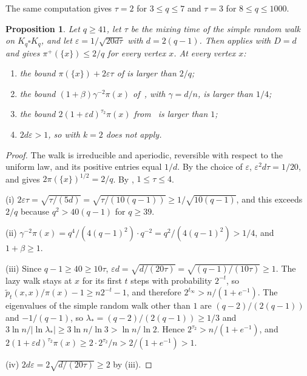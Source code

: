 \documentclass[11pt]{article}
\newtheorem{proposition}[theorem]{Proposition}
\theoremstyle{remark}
\theoremstyle{plain}
\begin{document}
The same computation gives $\tau=2$ for $3\le q\le7$ and $\tau=3$ for $8\le q\le1000$.

\begin{proposition}\label{prop:rook}
Let $q\ge41$, let $\tau$ be the mixing time of the simple random walk on $K_q\square K_q$, and let
$\varepsilon=1/\sqrt{20d\tau}$ with $d=2(q-1)$. Then  applies with $D=d$ and gives
$\pi^+(\{x\})\le2/q$ for every vertex $x$. At every vertex $x$:
\begin{enumerate}[label=(\roman*)]
\item the bound $\pi(\{x\})+2\varepsilon\tau$ of  is larger than $2/q$;
\item the bound $(1+\beta)\gamma^{-2}\pi(x)$ of~\cite[Proposition~4.7]{HSS}, with $\gamma=d/n$, is larger than $1/4$;
\item the bound $2(1+\varepsilon d)^{\tau_2}\pi(x)$ from~\cite[Proposition~4.8]{HSS} is larger than $1$;
\item $2d\varepsilon>1$, so \cite[Theorem~3.3]{Zu} with $k=2$ does not apply.
\end{enumerate}
\end{proposition}

\begin{proof}
The walk is irreducible and aperiodic, reversible with respect to the uniform law, and its positive entries equal
$1/d$. By the choice of $\varepsilon$, $\varepsilon^2d\tau=1/20$, and  gives $2\pi(\{x\})^{1/2}=2/q$.
By , $1\le\tau\le4$.

(i) $2\varepsilon\tau=\sqrt{\tau/(5d)}=\sqrt{\tau/(10(q-1))}\ge1/\sqrt{10(q-1)}$, and this exceeds $2/q$ because
$q^2>40(q-1)$ for $q\ge39$.

(ii) $\gamma^{-2}\pi(x)=q^4/(4(q-1)^2)\cdot q^{-2}=q^2/(4(q-1)^2)>1/4$, and $1+\beta\ge1$.

(iii) Since $q-1\ge40\ge10\tau$, $\varepsilon d=\sqrt{d/(20\tau)}=\sqrt{(q-1)/(10\tau)}\ge1$. The lazy walk stays at $x$
for its first $t$ steps with probability $2^{-t}$, so $\tilde p_t(x,x)/\pi(x)-1\ge n2^{-t}-1$, and therefore
$2^{t_\infty}>n/(1+e^{-1})$. The eigenvalues of the simple random walk other than $1$ are
$(q-2)/(2(q-1))$ and $-1/(q-1)$, so $\lambda_*=(q-2)/(2(q-1))\ge1/3$ and $3\ln n/|\ln\lambda_*|\ge3\ln n/\ln3>\ln n/\ln2$.
Hence $2^{\tau_2}>n/(1+e^{-1})$, and $2(1+\varepsilon d)^{\tau_2}\pi(x)\ge2\cdot2^{\tau_2}/n>2/(1+e^{-1})>1$.

(iv) $2d\varepsilon=2\sqrt{d/(20\tau)}\ge2$ by (iii).
\end{proof}
\end{document}
